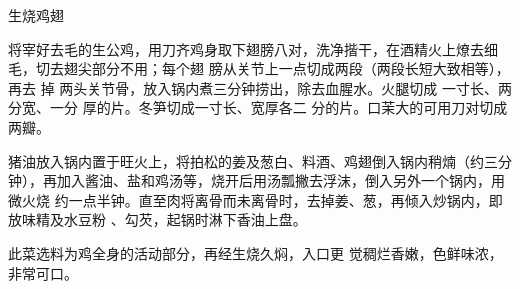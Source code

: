 \begin{recipe}[生烧大转弯]{生烧鸡翅}

\ingredients


\preparation

\step 将宰好去毛的生公鸡，用刀齐鸡身取下翅膀八对，洗净揩干，在酒精火上燎去细
毛，切去翅尖部分不用；每个翅 膀从关节上一点切成两段（两段长短大致相等），再去
掉 两头关节骨，放入锅内煮三分钟捞出，除去血腥水。火腿切成 一寸长、两分宽、一分
厚的片。冬笋切成一寸长、宽厚各二 分的片。口茉大的可用刀对切成两瓣。

\step 猪油放入锅内置于旺火上，将拍松的姜及葱白、料酒、鸡翅倒入锅内稍煵（约三分
钟），再加入酱油、盐和鸡汤等，烧开后用汤瓢撇去浮沫，倒入另外一个锅内，用微火烧
约一点半钟。直至肉将离骨而未离骨时，去掉姜、葱，再倾入炒锅内，即放味精及水豆粉
、勾芡，起锅时淋下香油上盘。

\features

此菜选料为鸡全身的活动部分，再经生烧久焖，入口更 觉稠烂香嫩，色鲜味浓，非常可口。

\end{recipe}

